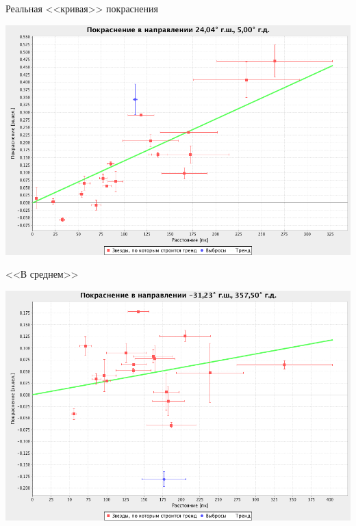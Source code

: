 \documentclass[14pt, fleqn, xcolor={dvipsnames, table}]{beamer}
\begin{document}
        \begin{frame}{Реальная <<кривая>> покраснения}
            \begin{center}
                \includegraphics[scale=0.35]{real-2-k.png}
            \end{center}             
        \end{frame}
        
        \begin{frame}{<<В среднем>>}
            \begin{center}
                \includegraphics[scale=0.35]{real-3-k.png}
            \end{center}             
        \end{frame}        
        
\end{document}
